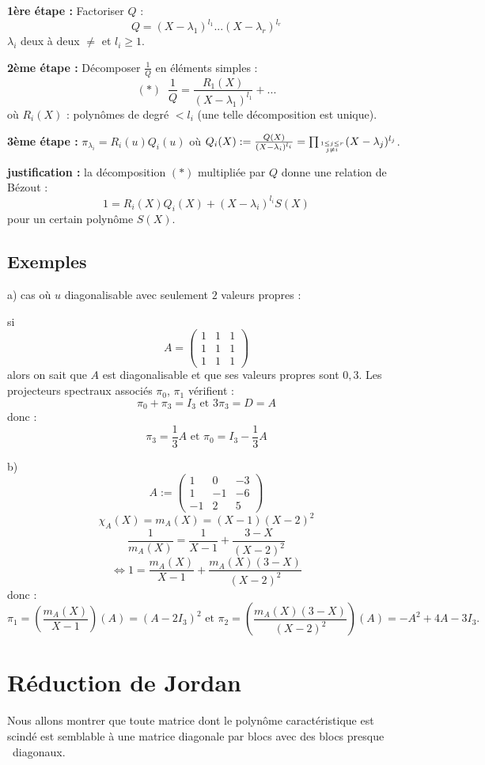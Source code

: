 \documentclass[class=report,crop=false]{standalone}
\begin{document}
{\bf 1ère étape :} Factoriser $Q$ : 
$$Q = (X-\lambda_1)^{l_1}...(X-\lambda_r)^{l_r}$$
$\lambda_i$ deux à deux $\neq$ et $l_i \ge 1$.

{\bf 2ème étape :} Décomposer $\frac{1}{Q}$ en éléments simples :
\[(*)\;\;\frac{1}{Q}= \frac{R_1(X)}{(X-\lambda_1)^{l_1}} + ...\]
où $R_i(X)$ : polynômes de degré $< l_i$ (une telle décomposition est unique).

{\bf 3ème étape :} $\pi_{\lambda_i} = R_i(u)Q_i(u)$ où $Q_i(X) : = \frac{Q(X)}{(X-\lambda_i)^{l_i}} = \prod_{1 \le j \le r \atop j \neq i} (X-\lambda_j)^{l_j}$.

{\bf justification : } la décomposition $(*)$ multipliée par $Q$ donne une relation de Bézout :
\[ 1 = R_i(X)Q_i(X) + (X-\lambda_i)^{l_i}S(X)\]
pour un certain polynôme $S(X)$.

\subsection{Exemples}

a) cas où $u$ diagonalisable avec seulement $2$ valeurs propres :

si \[A=\left(\begin{array}{ccc}
1&1&1\\
1&1&1\\
1&1&1
\end{array}\right)\]
alors on sait que $A$ est diagonalisable et que ses valeurs propres sont $0,3$. Les projecteurs spectraux associés $\pi_0$, $\pi_1$ vérifient :
\[\pi_0+\pi_3 = I_3 \text{ et } 3\pi_3 =D=A\]
donc : \[\pi_3=\frac{1}{3} A \text{ et } \pi_0 = I_3-\frac{1}{3}A \]

 b) \[A:=\left(\begin{array}{ccc}
1 & 0 & -3\\
1&-1&-6\\
-1&2&5
\end{array}\right)\]
\[\chi_A(X) = m_A(X)= (X-1)(X-2)^2\]
\[\frac{1}{m_A(X)} = \frac{1}{X-1}+\frac {3-X}{(X-2)^2} \]
\[\iff 1 = \frac{m_A(X)}{X-1} + \frac{m_A(X)(3-X)}{(X-2)^2}\]
donc :
\[\pi_1 = \left(\frac{m_A(X)}{X-1}\right)(A) = (A-2
I_3)^2 \text{ et } \pi_2 = \left(\frac{m_A(X)(3-X)}{(X-2)^2}\right)(A) =  -A^2+4A-3I_3
.\]

\section{Réduction de Jordan}


Nous allons montrer que toute matrice dont le polynôme caractéristique est scindé est semblable à une matrice diagonale par blocs avec des blocs \og presque \fg\ diagonaux. 
\end{document}
